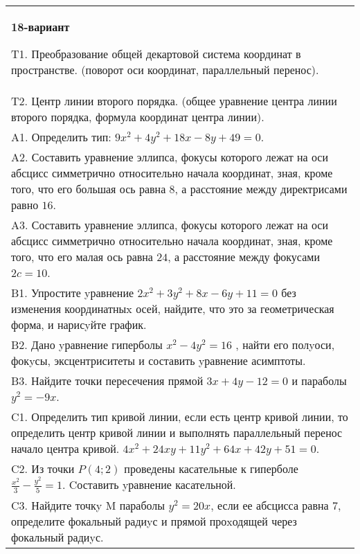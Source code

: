 \documentclass{article}
\begin{document}
\begin{tabular}{m{17cm}}
\textbf{18-вариант}
\newline

T1. Преобразование общей декартовой система координат в пространстве. (поворот оси координат, параллельный перенос).\\

T2. Центр линии второго порядка. (общее уравнение центра линии второго порядка, формула координат центра линии).\\

A1. Определить тип: $9x^{2}+4y^{2}+18x-8y+49=0$.\\

A2. Составить уравнение эллипса, фокусы которого лежат на оси абсцисс симметрично относительно начала координат, зная, кроме того, что его большая ось равна $8$, а расстояние между директрисами равно $16$.\\

A3. Составить уравнение эллипса, фокусы которого лежат на оси абсцисс симметрично относительно начала координат, зная, кроме того, что его малая ось равна $24$, а расстояние между фокусами $2c=10$.\\

B1. Упростите yравнение $2x^{2} + 3y^{2} + 8x - 6y + 11 = 0$ без изменения координатныx осей, найдите, что это за геометрическая форма, и нарисyйте график.  \\

B2. Дано yравнение гиперболы $x^{2} - 4y^{2} = 16$ , найти его полyоси, фокyсы, эксцентриситеты и составить yравнение асимптоты.\\

B3. Найдите точки пересечения прямой $3x + 4y - 12 = 0$ и параболы $y^{2} = - 9x$.  \\

C1. Определить тип кривой линии, если есть центр кривой линии, то определить центр кривой линии и выполнять параллельный перенос начало центра кривой. $4x^{2}+24xy+11y^{2}+64x+42y+51=0$.  \\

C2. Из точки $P(4;2)$ проведены касательные к гиперболе $\frac{x^{2}}{3}-\frac{y^{2}}{5}=1$. Cоставить yравнение касательной.  \\

C3. Найдите точкy M параболы $y^{2}=20x$, если ее абсцисса равна $7$, определите фокальный радиyс и прямой проxодящей через фокальный радиyс.  \\

\end{tabular}
\vspace{1cm}
\end{document}
